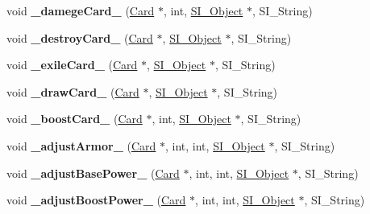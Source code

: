 \begin{DoxyCompactItemize}
\item 
\mbox{\label{class_field_a55b3bf353a0c4934357aa128d133e60f}} 
void {\bfseries \+\_\+damege\+Card\+\_\+} (\hyperlink{class_card}{Card} $\ast$, int, \hyperlink{class_s_i___object}{S\+I\+\_\+\+Object} $\ast$, S\+I\+\_\+\+String)
\item 
\mbox{\label{class_field_a164ddb43f7a3c3f5bd9567306ffac3db}} 
void {\bfseries \+\_\+destroy\+Card\+\_\+} (\hyperlink{class_card}{Card} $\ast$, \hyperlink{class_s_i___object}{S\+I\+\_\+\+Object} $\ast$, S\+I\+\_\+\+String)
\item 
\mbox{\label{class_field_abb421ff23bd05479fc41dcbb6546e7f5}} 
void {\bfseries \+\_\+exile\+Card\+\_\+} (\hyperlink{class_card}{Card} $\ast$, \hyperlink{class_s_i___object}{S\+I\+\_\+\+Object} $\ast$, S\+I\+\_\+\+String)
\item 
\mbox{\label{class_field_ad144c52441d58530220f19774585eec1}} 
void {\bfseries \+\_\+draw\+Card\+\_\+} (\hyperlink{class_card}{Card} $\ast$, \hyperlink{class_s_i___object}{S\+I\+\_\+\+Object} $\ast$, S\+I\+\_\+\+String)
\item 
\mbox{\label{class_field_a7daa06d7f7f6fad46dd19badd3e709a8}} 
void {\bfseries \+\_\+boost\+Card\+\_\+} (\hyperlink{class_card}{Card} $\ast$, int, \hyperlink{class_s_i___object}{S\+I\+\_\+\+Object} $\ast$, S\+I\+\_\+\+String)
\item 
\mbox{\label{class_field_a12dcd46daeccffcd474b6973c4d318e8}} 
void {\bfseries \+\_\+adjust\+Armor\+\_\+} (\hyperlink{class_card}{Card} $\ast$, int, int, \hyperlink{class_s_i___object}{S\+I\+\_\+\+Object} $\ast$, S\+I\+\_\+\+String)
\item 
\mbox{\label{class_field_a4cdc86ef978d13d46a28e8e9fd2b4baf}} 
void {\bfseries \+\_\+adjust\+Base\+Power\+\_\+} (\hyperlink{class_card}{Card} $\ast$, int, int, \hyperlink{class_s_i___object}{S\+I\+\_\+\+Object} $\ast$, S\+I\+\_\+\+String)
\item 
\mbox{\label{class_field_a530a6233976a182c777122999ad83b8d}} 
void {\bfseries \+\_\+adjust\+Boost\+Power\+\_\+} (\hyperlink{class_card}{Card} $\ast$, int, int, \hyperlink{class_s_i___object}{S\+I\+\_\+\+Object} $\ast$, S\+I\+\_\+\+String)

\end{DoxyCompactItemize}
